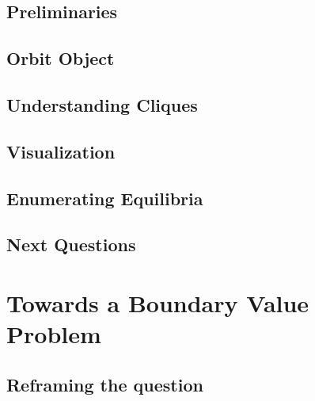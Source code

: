 \documentclass[]{article}
\begin{document}
\subsection{Preliminaries}
\subsection{Orbit Object}
\subsection{Understanding Cliques}
\subsection{Visualization}
\subsection{Enumerating Equilibria}
\subsection{Next Questions}
\section{Towards a Boundary Value Problem}
\subsection{Reframing the question}
\end{document}

